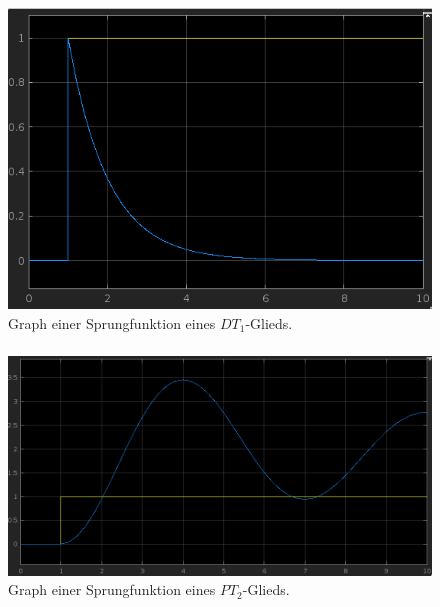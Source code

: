 \documentclass{article}
\begin{document}
			\subsubsection{}
				\begin{figure}[h]
					\includegraphics[scale=0.47, center]{./Sprungfunktion_DT_1_Glied.png}
					\caption{Graph einer Sprungfunktion eines $DT_1$-Glieds.}
					\label{fig2: Springfunktion-DT-1-Glied}
				\end{figure}	
\newpage
			\subsubsection{}
				\begin{figure}[ht]
					\includegraphics[scale=0.4, center]{./Sprungfunktion_PT_2_Glied.png}
					\caption{Graph einer Sprungfunktion eines $PT_2$-Glieds.}
					\label{fig3: Springfunktion-PT-2-Glied}
				\end{figure}	
\end{document}
